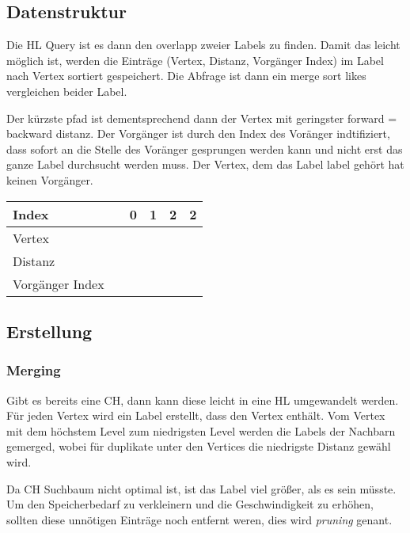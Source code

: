 \subsection{Datenstruktur}

Die HL Query ist es dann den overlapp zweier Labels zu finden.
Damit das leicht möglich ist, werden die Einträge (Vertex, Distanz, Vorgänger Index) im Label nach Vertex sortiert gespeichert.
Die Abfrage ist dann ein merge sort likes vergleichen beider Label.

Der kürzste pfad ist dementsprechend dann der Vertex mit geringster forward = backward distanz.
Der Vorgänger ist durch den Index des Voränger indtifiziert, dass sofort an die Stelle des Voränger gesprungen werden kann und nicht erst das ganze Label durchsucht werden muss.
Der Vertex, dem das Label label gehört hat keinen Vorgänger.

\begin{table}[ht]
    \centering
    \begin{tabular}{@{}llllll@{}}
        \toprule
        Index           &  & 0 & 1 & 2 & 2 \\ \midrule
        Vertex          &  &   &   &   &   \\
        Distanz         &  &   &   &   &   \\
        Vorgänger Index &  &   &   &   &   \\ \bottomrule
    \end{tabular}
\end{table}



\subsection{Erstellung}

\subsubsection{Merging}
Gibt es bereits eine CH, dann kann diese leicht in eine HL umgewandelt werden.
Für jeden Vertex wird ein Label erstellt, dass den Vertex enthält.
Vom Vertex mit dem höchstem Level zum niedrigsten Level werden die Labels der Nachbarn gemerged, wobei für duplikate unter den Vertices die niedrigste Distanz gewähl wird.

Da CH Suchbaum nicht optimal ist, ist das Label viel größer, als es sein müsste.
Um den Speicherbedarf zu verkleinern und die Geschwindigkeit zu erhöhen, sollten diese unnötigen Einträge noch entfernt weren, dies wird \emph{pruning} genant.

